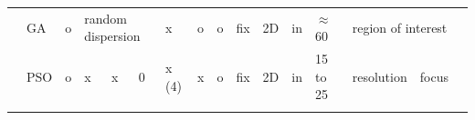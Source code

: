 \begin{landscape}
\begin{table}[]
\begin{tabular}{@{}  l|p{1.6cm} p{1.7cm} l  l p{0.659cm} p{0.612cm}p{.659cm} p{1.11cm} p{1.5cm} p{1.57cm}p{0.9cm}p{1.6cm}p{1.3cm}p{1.2cm} p{1.2cm}@{}}
\multicolumn{1}{l|}{\cellcolor[HTML]{FFFFFF}\cite{165*jiang2010}} & GA                                                                                                             & o                                                                     & \multicolumn{3}{p{0.659cm}}{\cellcolor[HTML]{FFFFFF}random  \newline dispersion}                                                                                    & x                                                & o                                                 & o                                                 & fix                                                       & 2D                                                                                                              & in                                                           & $\approx$ 60                                                                                              & \multicolumn{2}{l}{\cellcolor[HTML]{FFFFFF}region of interest}                                                                                              &                                  \\
\rowcolor[HTML]{EFEFEF} 
\multicolumn{1}{l|}{\cellcolor[HTML]{EFEFEF}\cite{193*fu2014}} & PSO                                                                                                            & o                                                                     & x                                              & x                                              & 0                                              & x (4)                                            & x                                                 & o                                                 & fix                                                       & 2D                                                                                                              & in                                                           & 15 to 25                                                                                                  & resolution                                                                                                                  & focus                         &                                 \\
\rowcolor[HTML]{FFFFFF} 

\end{tabular}
\end{table}
\end{landscape}
